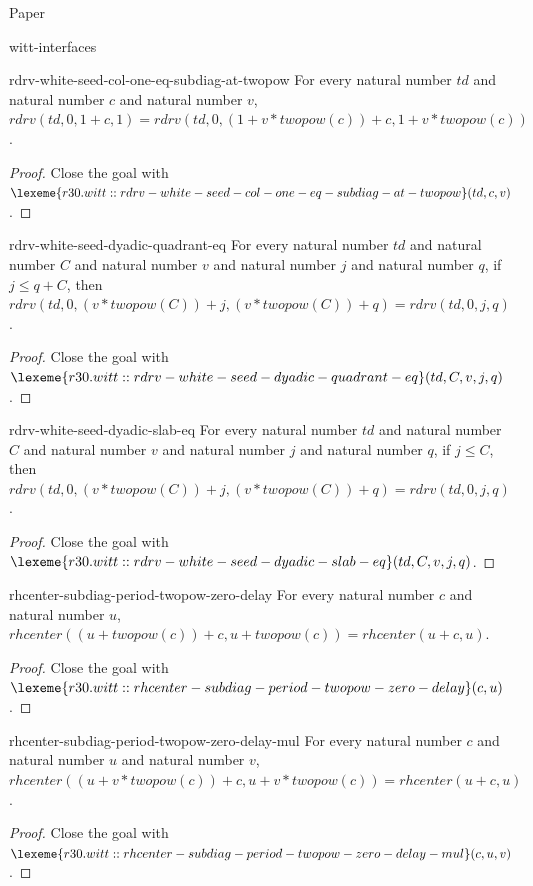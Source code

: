 \begin{lexlean}{Paper}
\begin{section}{witt-interfaces}
  \begin{theorem}{rdrv-white-seed-col-one-eq-subdiag-at-twopow}
  For every natural number \(td\) and natural number \(c\) and natural number \(v\), \(rdrv(td, 0, 1 + c, 1) = rdrv(td, 0, (1 + v * twopow(c)) + c, 1 + v * twopow(c))\).
  \begin{proof}
  Close the goal with \(\lexeme{r30.witt::rdrv-white-seed-col-one-eq-subdiag-at-twopow}(td, c, v)\).
  \end{proof}
  \end{theorem}

  \begin{theorem}{rdrv-white-seed-dyadic-quadrant-eq}
  For every natural number \(td\) and natural number \(C\) and natural number \(v\) and natural number \(j\) and natural number \(q\), if \(j ≤ q + C\), then \(rdrv(td, 0, (v * twopow(C)) + j, (v * twopow(C)) + q) = rdrv(td, 0, j, q)\).
  \begin{proof}
  Close the goal with \(\lexeme{r30.witt::rdrv-white-seed-dyadic-quadrant-eq}(td, C, v, j, q)\).
  \end{proof}
  \end{theorem}

  \begin{theorem}{rdrv-white-seed-dyadic-slab-eq}
  For every natural number \(td\) and natural number \(C\) and natural number \(v\) and natural number \(j\) and natural number \(q\), if \(j ≤ C\), then \(rdrv(td, 0, (v * twopow(C)) + j, (v * twopow(C)) + q) = rdrv(td, 0, j, q)\).
  \begin{proof}
  Close the goal with \(\lexeme{r30.witt::rdrv-white-seed-dyadic-slab-eq}(td, C, v, j, q)\).
  \end{proof}
  \end{theorem}

  \begin{theorem}{rhcenter-subdiag-period-twopow-zero-delay}
  For every natural number \(c\) and natural number \(u\), \(rhcenter((u + twopow(c)) + c, u + twopow(c)) = rhcenter(u + c, u)\).
  \begin{proof}
  Close the goal with \(\lexeme{r30.witt::rhcenter-subdiag-period-twopow-zero-delay}(c, u)\).
  \end{proof}
  \end{theorem}

  \begin{theorem}{rhcenter-subdiag-period-twopow-zero-delay-mul}
  For every natural number \(c\) and natural number \(u\) and natural number \(v\), \(rhcenter((u + v * twopow(c)) + c, u + v * twopow(c)) = rhcenter(u + c, u)\).
  \begin{proof}
  Close the goal with \(\lexeme{r30.witt::rhcenter-subdiag-period-twopow-zero-delay-mul}(c, u, v)\).
  \end{proof}
  \end{theorem}


\end{section}
\end{lexlean}
